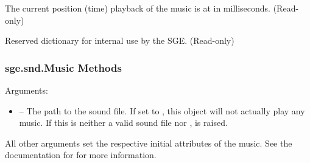 \documentclass[letterpaper,10pt,english]{sphinxmanual}
\begin{document}
\begin{fulllineitems}
\begin{fulllineitems}
\end{fulllineitems}


\begin{fulllineitems}
\label{snd:sge.snd.Music.position}
The current position (time) playback of the music is at in
milliseconds.  (Read-only)

\end{fulllineitems}


\begin{fulllineitems}
\label{snd:sge.snd.Music.rd}
Reserved dictionary for internal use by the SGE.  (Read-only)

\end{fulllineitems}


\end{fulllineitems}



\subsubsection{sge.snd.Music Methods}
\label{snd:sge-snd-music-methods}

\begin{fulllineitems}
\label{snd:sge.snd.Music.__init__}
Arguments:
\begin{itemize}
\item {} 
 -- The path to the sound file.  If set to
, this object will not actually play any music.
If this is neither a valid sound file nor ,
 is raised.

\end{itemize}

All other arguments set the respective initial attributes of the
music.  See the documentation for {\hyperref[snd:sge.snd.Music]{\emph{}}} for
more information.

\end{fulllineitems}

\end{document}
